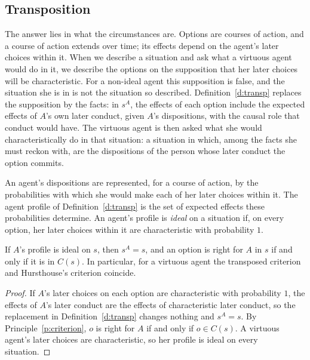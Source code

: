 \documentclass{situationist-preprint}
\newcommand{\Ch}{C}
\begin{document}
\subsection{Transposition}

The answer lies in what the circumstances are. Options are courses of action, and a course of action extends over time; its effects depend on the agent's later choices within it. When we describe a situation and ask what a virtuous agent would do in it, we describe the options on the supposition that her later choices will be characteristic. For a non-ideal agent this supposition is false, and the situation she is in is not the situation so described. Definition~\ref{d:transp} replaces the supposition by the facts: in $s^A$, the effects of each option include the expected effects of $A$'s own later conduct, given $A$'s dispositions, with the causal role that conduct would have. The virtuous agent is then asked what she would characteristically do in that situation: a situation in which, among the facts she must reckon with, are the dispositions of the person whose later conduct the option commits.

\begin{definition}\label{d:profile}
An agent's dispositions are represented, for a course of action, by the probabilities with which she would make each of her later choices within it. The agent profile of Definition~\ref{d:transp} is the set of expected effects these probabilities determine. An agent's profile is \emph{ideal} on a situation if, on every option, her later choices within it are characteristic with probability $1$.
\end{definition}

\begin{theorem}[Coincidence]\label{t:coinc}
If $A$'s profile is ideal on $s$, then $s^A=s$, and an option is right for $A$ in $s$ if and only if it is in $\Ch(s)$. In particular, for a virtuous agent the transposed criterion and Hursthouse's criterion coincide.
\end{theorem}

\begin{proof}
If $A$'s later choices on each option are characteristic with probability $1$, the effects of $A$'s later conduct are the effects of characteristic later conduct, so the replacement in Definition~\ref{d:transp} changes nothing and $s^A=s$. By Principle~\ref{p:criterion}, $o$ is right for $A$ if and only if $o\in\Ch(s)$. A virtuous agent's later choices are characteristic, so her profile is ideal on every situation.
\end{proof}
\end{document}
